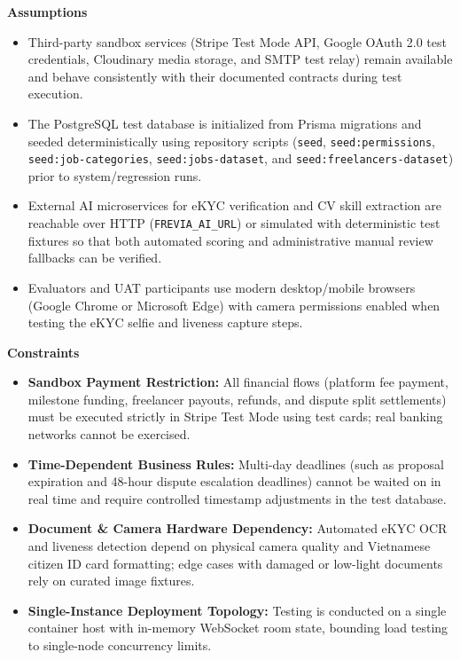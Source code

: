 \documentclass[12pt,a4paper]{article}
\begin{document}
\textbf{Assumptions}
\begin{itemize}
  \item Third-party sandbox services (Stripe Test Mode API, Google OAuth 2.0 test credentials, Cloudinary media storage, and SMTP test relay) remain available and behave consistently with their documented contracts during test execution.
  \item {\sloppy The PostgreSQL test database is initialized from Prisma migrations and seeded deterministically using repository scripts (\texttt{seed}, \texttt{seed:permissions}, \texttt{seed:job-\allowbreak{}categories}, \texttt{seed:jobs-\allowbreak{}dataset}, and \texttt{seed:freelancers-\allowbreak{}dataset}) prior to system/regression runs.\par}
  \item External AI microservices for eKYC verification and CV skill extraction are reachable over HTTP (\texttt{FREVIA\_AI\_URL}) or simulated with deterministic test fixtures so that both automated scoring and administrative manual review fallbacks can be verified.
  \item Evaluators and UAT participants use modern desktop/mobile browsers (Google Chrome or Microsoft Edge) with camera permissions enabled when testing the eKYC selfie and liveness capture steps.
\end{itemize}

\textbf{Constraints}
\begin{itemize}
  \item \textbf{Sandbox Payment Restriction:} All financial flows (platform fee payment, milestone funding, freelancer payouts, refunds, and dispute split settlements) must be executed strictly in Stripe Test Mode using test cards; real banking networks cannot be exercised.
  \item \textbf{Time-Dependent Business Rules:} Multi-day deadlines (such as proposal expiration and 48-hour dispute escalation deadlines) cannot be waited on in real time and require controlled timestamp adjustments in the test database.
  \item \textbf{Document \& Camera Hardware Dependency:} Automated eKYC OCR and liveness detection depend on physical camera quality and Vietnamese citizen ID card formatting; edge cases with damaged or low-light documents rely on curated image fixtures.
  \item \textbf{Single-Instance Deployment Topology:} Testing is conducted on a single container host with in-memory WebSocket room state, bounding load testing to single-node concurrency limits.
\end{itemize}
\end{document}
